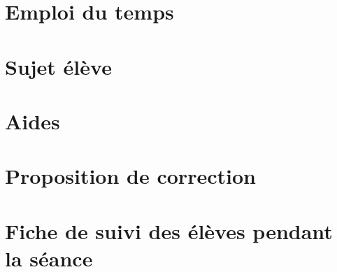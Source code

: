 \documentclass[12pt,a4paper]{article}
\begin{document}
\newpage

\section{Emploi du temps}
\label{ann:edt}



\section{Sujet élève}
\label{ann:sujet}



\section{Aides}
\label{ann:aides}



\section{Proposition de correction}
\label{ann:corr}



\section{Fiche de suivi des élèves pendant la séance}
\label{ann:suivi}


\end{document}
